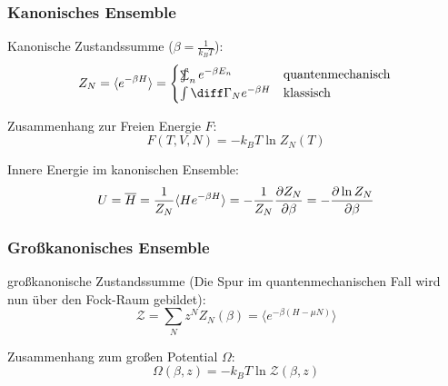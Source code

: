 \documentclass[11pt]{article}
\DeclareMathOperator*{\SumInt}{%
\mathchoice%
  {\ooalign{$\displaystyle\sum$\cr\hidewidth$\displaystyle\int$\hidewidth\cr}}
  {\ooalign{\raisebox{.14\height}{\scalebox{.7}{$\textstyle\sum$}}\cr\hidewidth$\textstyle\int$\hidewidth\cr}}
  {\ooalign{\raisebox{.2\height}{\scalebox{.6}{$\scriptstyle\sum$}}\cr$\scriptstyle\int$\cr}}
  {\ooalign{\raisebox{.2\height}{\scalebox{.6}{$\scriptstyle\sum$}}\cr$\scriptstyle\int$\cr}}
}
\numberwithin{equation}{section}
\begin{document}
      \subsubsection{Kanonisches Ensemble}
        Kanonische Zustandssumme ($\beta = \frac{1}{k_B T}$):
        \begin{equation}
          Z_N=\langle e^{-\beta H} \rangle
            = \begin{cases}
                \SumInt_n e^{-\beta E_n} & \text{quantenmechanisch} \\
                \int \diff \Gamma_N e^{-\beta H} & \text{klassisch}
              \end{cases} \\
        \end{equation}

        Zusammenhang zur Freien Energie $F$:
        \begin{equation}
          F(T, V, N) = -k_B T \ln{Z_N(T)}
        \end{equation}


        Innere Energie im kanonischen Ensemble:
        \begin{equation}
          U = \overline{H} = \frac{1}{Z_N}\langle He^{-\beta H}\rangle = -\frac{1}{Z_N}\frac{\partial Z_N}{\partial \beta} = -\frac{\partial \ln Z_N}{\partial \beta}
        \end{equation}

      \subsubsection{Großkanonisches Ensemble}
        großkanonische Zustandssumme (Die Spur im quantenmechanischen Fall wird nun über den Fock-Raum gebildet):
        \begin{equation}
          \mathcal{Z} = \sum_N z^N Z_N(\beta) = \langle e^{-\beta(H-\mu N)} \rangle
        \end{equation}

        Zusammenhang zum großen Potential $\Omega$:
        \begin{equation}
          \Omega(\beta,z) = -k_B T \ln \mathcal{Z}(\beta,z)
        \end{equation}
\end{document}
